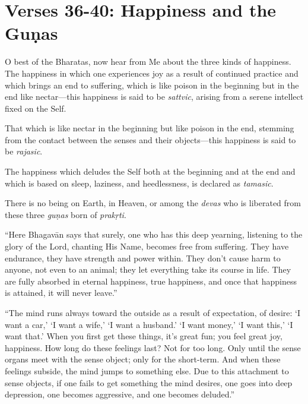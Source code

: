 \section{Verses 36-40: Happiness and the Guṇas}\label{sec-verses-36-40-happiness-and-the-gunas}

{O best of the Bharatas, now hear from Me about the three kinds of happiness. The happiness in which one experiences joy as a result of continued practice and which brings an end to suffering, which is like poison in the beginning but in the end like nectar---this happiness is said to be \textit{sattvic}, arising from a serene intellect fixed on the Self.}

{That which is like nectar in the beginning but like poison in the end, stemming from the contact between the senses and their objects---this happiness is said to be \textit{rajasic}.}

{The happiness which deludes the Self both at the beginning and at the end and which is based on sleep, laziness, and heedlessness, is declared as \textit{tamasic}.}

{There is no being on Earth, in Heaven, or among the \textit{devas} who is liberated from these three \textit{guṇas} born of \textit{prakṛti}.}

\enquote{Here Bhagavān says that surely, one who has this deep yearning, listening to the glory of the Lord, chanting His Name, becomes free from suffering. They have endurance, they have strength and power within. They don’t cause harm to anyone, not even to an animal; they let everything take its course in life. They are fully absorbed in eternal happiness, true happiness, and once that happiness is attained, it will never leave.}

\enquote{The mind runs always toward the outside as a result of expectation, of desire: \enquote{I want a car,} \enquote{I want a wife,} \enquote{I want a husband.} \enquote{I want money,} \enquote{I want this,} \enquote{I want that.} When you first get these things, it’s great fun; you feel great joy, happiness. How long do these feelings last? Not for too long. Only until the sense organs meet with the sense object; only for the short-term. And when these feelings subside, the mind jumps to something else. Due to this attachment to sense objects, if one fails to get something the mind desires, one goes into deep depression, one becomes aggressive, and one becomes deluded.}

